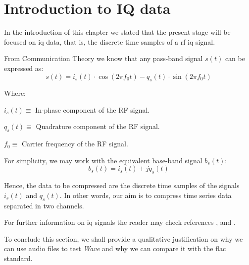 \section{Introduction to IQ data}

In the introduction of this chapter we stated that the present stage will be focused on \acrshort{iq} data, that is, the discrete time samples of a \acrshort{rf} \acrshort{iq} signal.

From Communication Theory we know that any pass-band signal $s(t)$ can be expressed as:
\begin{equation}
s(t) = i_s(t) \cdot \cos(2\pi f_0 t) - q_s(t) \cdot \sin(2\pi f_0 t)
\end{equation}

Where:
\begin{description}
	\item $i_s(t) \equiv$ In-phase component of the RF signal.
	\item $q_s(t) \equiv$ Quadrature component of the RF signal.
	\item $f_0 \equiv$ Carrier frequency of the RF signal.
\end{description}

For simplicity, we may work with the equivalent base-band signal $b_s(t)$:
\begin{equation}
	b_s(t) = i_s(t) + j q_s(t)
\end{equation}

Hence, the data to be compressed are the discrete time samples of the signals $i_s(t)$ and $q_s(t)$. In other words, our aim is to compress time series data separated in two channels.

For further information on \acrshort{iq} signals the reader may check references \parencite{IQintro}, \parencite{carlson2010communication} and \parencite{ICOM}.

To conclude this section, we shall provide a qualitative justification on why we can use audio files to test \textit{Wave} and why we can compare it with the \acrshort{flac} standard.

